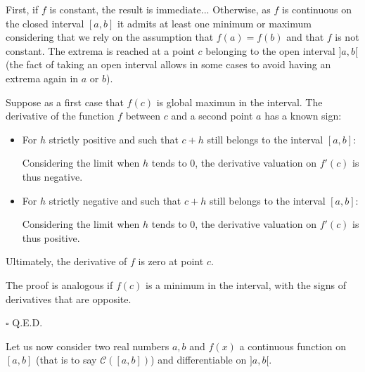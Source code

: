 \begin{dem}
First, if $f$ is constant, the result is immediate... Otherwise, as $f$ is continuous on the closed interval $[a, b]$ it admits at least one minimum or maximum considering that we rely on the assumption that $f(a)=f(b)$ and that $f$ is not constant. The extrema is reached at a point $c$ belonging to the open interval $] a, b [$ (the fact of taking an open interval allows in some cases to avoid having an extrema again in $a$ or $b$).

Suppose as a first case that $f(c)$ is global maximun in the interval. The derivative of the function $f$ between $c$ and a second point $a$ has a known sign:

	\begin{itemize}
		\item For $h$ strictly positive and such that $c + h$ still belongs to the interval $[a, b]$:
	
Considering the limit when $h$ tends to $0$, the  derivative valuation on $f'(c)$ is thus negative.
	 \item For $h$ strictly negative and such that $c + h$ still belongs to the interval $[a, b]$:
	
Considering the limit when $h$ tends to $0$, the  derivative valuation on $f'(c)$ is thus positive.
	\end{itemize}
Ultimately, the derivative of $f$ is zero at point $c$.

The proof is analogous if $f(c)$ is a minimum in the interval, with the signs of derivatives that are opposite.
		\begin{flushright}
			$\square$  Q.E.D.
		\end{flushright}
\end{dem}
Let us now consider two real numbers $a,b$ and $f (x) $ a continuous function on $[a, b]$ (that is to say $\mathcal{C}([a,b])$) and differentiable on $] a, b [$. 

